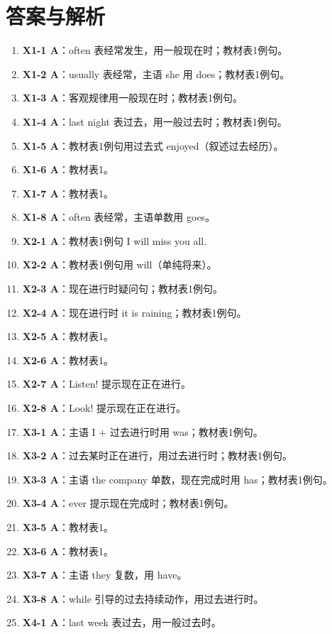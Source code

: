 \documentclass[11pt,a4paper]{ctexart}
\begin{document}
\section*{答案与解析}
\small
\begin{enumerate}[leftmargin=1.6em,itemsep=2pt]
\item \textbf{X1-1 A}：often 表经常发生，用一般现在时；教材表1例句。
\item \textbf{X1-2 A}：usually 表经常，主语 she 用 does；教材表1例句。
\item \textbf{X1-3 A}：客观规律用一般现在时；教材表1例句。
\item \textbf{X1-4 A}：last night 表过去，用一般过去时；教材表1例句。
\item \textbf{X1-5 A}：教材表1例句用过去式 enjoyed（叙述过去经历）。
\item \textbf{X1-6 A}：教材表1。
\item \textbf{X1-7 A}：教材表1。
\item \textbf{X1-8 A}：often 表经常，主语单数用 goes。
\item \textbf{X2-1 A}：教材表1例句 I will miss you all.
\item \textbf{X2-2 A}：教材表1例句用 will（单纯将来）。
\item \textbf{X2-3 A}：现在进行时疑问句；教材表1例句。
\item \textbf{X2-4 A}：现在进行时 it is raining；教材表1例句。
\item \textbf{X2-5 A}：教材表1。
\item \textbf{X2-6 A}：教材表1。
\item \textbf{X2-7 A}：Listen! 提示现在正在进行。
\item \textbf{X2-8 A}：Look! 提示现在正在进行。
\item \textbf{X3-1 A}：主语 I + 过去进行时用 was；教材表1例句。
\item \textbf{X3-2 A}：过去某时正在进行，用过去进行时；教材表1例句。
\item \textbf{X3-3 A}：主语 the company 单数，现在完成时用 has；教材表1例句。
\item \textbf{X3-4 A}：ever 提示现在完成时；教材表1例句。
\item \textbf{X3-5 A}：教材表1。
\item \textbf{X3-6 A}：教材表1。
\item \textbf{X3-7 A}：主语 they 复数，用 have。
\item \textbf{X3-8 A}：while 引导的过去持续动作，用过去进行时。
\item \textbf{X4-1 A}：last week 表过去，用一般过去时。

\end{enumerate}
\end{document}
